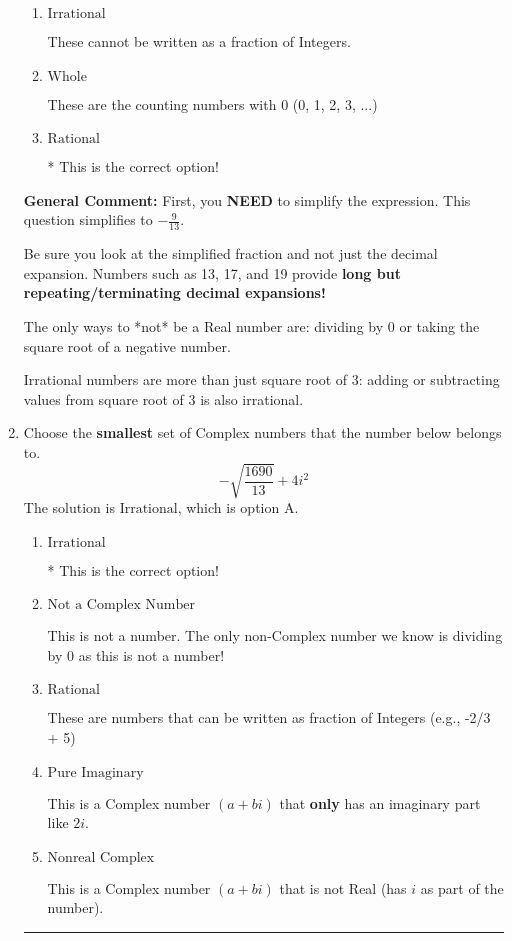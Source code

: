 \documentclass{extbook}[14pt]
\newcommand{\litem}[1]{\item #1

\rule{\textwidth}{0.4pt}}
\begin{document}
\begin{enumerate}
{\begin{enumerate}[label=\Alph*.]
These are Nonreal Complex numbers \textbf{OR} things that are not numbers (e.g., dividing by 0).
\item \( \text{Irrational} \)

These cannot be written as a fraction of Integers.
\item \( \text{Whole} \)

These are the counting numbers with 0 (0, 1, 2, 3, ...)
\item \( \text{Rational} \)

* This is the correct option!
\end{enumerate}

\textbf{General Comment:} First, you \textbf{NEED} to simplify the expression. This question simplifies to $-\frac{9}{13}$. 
 
 Be sure you look at the simplified fraction and not just the decimal expansion. Numbers such as 13, 17, and 19 provide \textbf{long but repeating/terminating decimal expansions!} 
 
 The only ways to *not* be a Real number are: dividing by 0 or taking the square root of a negative number. 
 
 Irrational numbers are more than just square root of 3: adding or subtracting values from square root of 3 is also irrational.
}
\litem{
Choose the \textbf{smallest} set of Complex numbers that the number below belongs to.
\[ -\sqrt{\frac{1690}{13}}+4i^2 \]The solution is \( \text{Irrational} \), which is option A.\begin{enumerate}[label=\Alph*.]
\item \( \text{Irrational} \)

* This is the correct option!
\item \( \text{Not a Complex Number} \)

This is not a number. The only non-Complex number we know is dividing by 0 as this is not a number!
\item \( \text{Rational} \)

These are numbers that can be written as fraction of Integers (e.g., -2/3 + 5)
\item \( \text{Pure Imaginary} \)

This is a Complex number $(a+bi)$ that \textbf{only} has an imaginary part like $2i$.
\item \( \text{Nonreal Complex} \)

This is a Complex number $(a+bi)$ that is not Real (has $i$ as part of the number).
\end{enumerate}

}
\end{enumerate}
\end{document}

